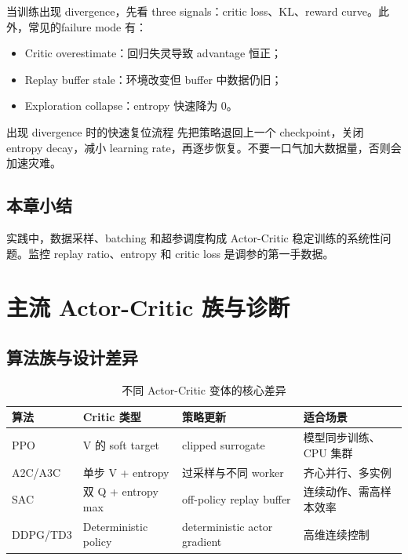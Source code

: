\documentclass[a4paper]{article}
\begin{document}
当训练出现 divergence，先看 three signals：critic loss、KL、reward curve。此外，常见的failure mode 有：
\begin{itemize}
    \item Critic overestimate：回归失灵导致 advantage 恒正；
    \item Replay buffer stale：环境改变但 buffer 中数据仍旧；
    \item Exploration collapse：entropy 快速降为 0。
\end{itemize}

\begin{warningbox}{出现 divergence 时的快速复位流程}
先把策略退回上一个 checkpoint，关闭 entropy decay，减小 learning rate，再逐步恢复。不要一口气加大数据量，否则会加速灾难。
\end{warningbox}

\subsection{本章小结}

实践中，数据采样、batching 和超参调度构成 Actor-Critic 稳定训练的系统性问题。监控 replay ratio、entropy 和 critic loss 是调参的第一手数据。

\section{主流 Actor-Critic 族与诊断}

\subsection{算法族与设计差异}

\begin{table}[H]
\centering
\begin{tabular}{p{}p{}p{}p{}}
\toprule
算法 & Critic 类型 & 策略更新 & 适合场景 \\
\midrule
PPO & V 的 soft target & clipped surrogate & 模型同步训练、CPU 集群 \\
A2C/A3C & 单步 V + entropy & 过采样与不同 worker & 齐心并行、多实例 \\
SAC & 双 Q + entropy max & off-policy replay buffer & 连续动作、需高样本效率 \\
DDPG/TD3 & Deterministic policy & deterministic actor gradient & 高维连续控制 \\
\bottomrule
\end{tabular}
\caption{不同 Actor-Critic 变体的核心差异}
\end{table}
\end{document}
